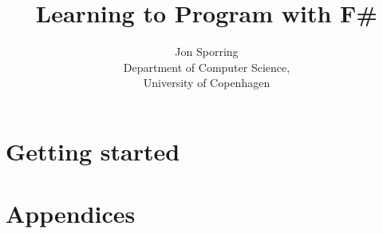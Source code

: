 \documentclass[graybox,envcountchap]{svmono}
\begin{document}
\author{Jon Sporring\\[1cm]Department of Computer Science,\\University of Copenhagen}
\title{Learning to Program with F\#}
\maketitle

\frontmatter%

%
%

%

\tableofcontents

%


\mainmatter

\part{Getting started}


















\part{Appendices}
\appendix




%

\backmatter%
 
 

\printindex

\end{document}
